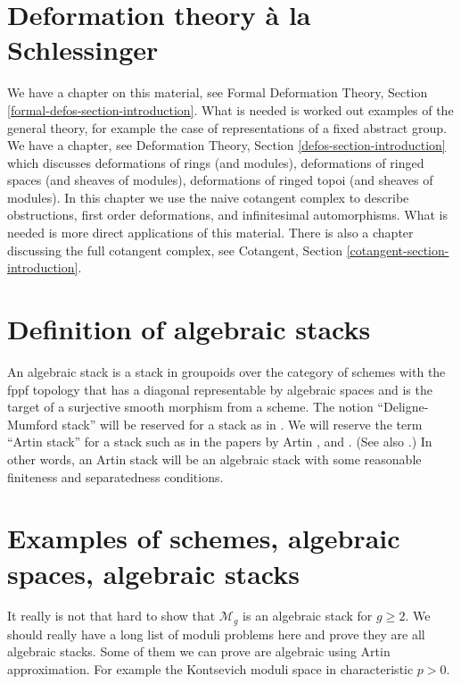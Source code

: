 \section{Deformation theory \`a la Schlessinger}
\label{section-deformation-schlessinger}

\noindent
We have a chapter on this material, see
Formal Deformation Theory, Section \ref{formal-defos-section-introduction}.
What is needed is worked out examples of the general theory, for example
the case of representations of a fixed abstract group.
We have a chapter, see
Deformation Theory, Section \ref{defos-section-introduction}
which discusses deformations of rings (and modules),
deformations of ringed spaces (and sheaves of modules),
deformations of ringed topoi (and sheaves of modules).
In this chapter we use the naive cotangent complex
to describe obstructions, first order deformations, and
infinitesimal automorphisms.
What is needed is more direct applications of this material.
There is also a chapter discussing the full cotangent complex, see
Cotangent, Section \ref{cotangent-section-introduction}.


\section{Definition of algebraic stacks}
\label{section-definition-algebraic-stacks}

\noindent
An algebraic stack is a stack in groupoids over the category of schemes
with the fppf topology that has a diagonal representable by algebraic
spaces and is the target of a surjective smooth morphism from a scheme.
The notion ``Deligne-Mumford stack'' will be reserved for a stack as in
\cite{DM}. We will reserve the term ``Artin stack'' for
a stack such as in the papers by Artin \cite{ArtinI}, and \cite{ArtinVersal}.
(See also \cite{conrad-dejong}.) In other words, an Artin stack will be an
algebraic stack with some reasonable finiteness and separatedness conditions.


\section{Examples of schemes, algebraic spaces, algebraic stacks}
\label{section-examples-stacks}

\noindent
It really is not that hard to show that $\mathcal{M}_g$ is an algebraic
stack for $g\geq 2$. We should really have a long list of moduli problems
here and prove they are all algebraic stacks. Some of them we can
prove are algebraic using Artin approximation. For example the Kontsevich
moduli space in characteristic $p > 0$.


